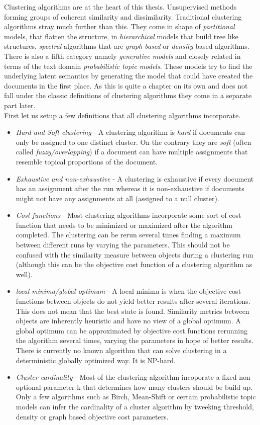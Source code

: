   Clustering algorithms are at the heart of this thesis. Unsupervised methods forming groups of coherent similarity and dissimilarity. Traditional clustering algorithms stray much further than this. They come in shape of \emph{partitional} models, that flatten the structure, in \emph{hierarchical} models that build tree like structures, \emph{spectral} algorithms that are \emph{graph based} or \emph{density} based algorithms. There is also a fifth category namely \emph{generative models} and closely related in terms of the text domain \emph{probabilistic topic models}. These models try to find the underlying latent semantics by generating the model that could have created the documents in the first place. As this is quite a chapter on its own and does not fall under the classic definitions of clustering algorithms they come in a separate part later.\\
  First let us setup a few definitions that all clustering algorithms incorporate.

  \begin{itemize}
    \item \emph{Hard and Soft clustering} - A clustering algorithm is \emph{hard} if documents can only be assigned to one distinct cluster. On the contrary they are \emph{soft} (often called \emph{fuzzy/overlapping}) if a document can have multiple assignments that resemble topical proportions of the document.
    \item \emph{Exhaustive and non-exhaustive} - A clustering is exhaustive if every document has an assignment after the run whereas it is non-exhaustive if documents might not have any assignments at all (assigned to a null cluster).
    \item \emph{Cost functions} - Most clustering algorithms incorporate some sort of cost function that needs to be minimized or maximized after the algorithm completed. The clustering can be rerun several times finding a maximum between different runs by varying the parameters. This should not be confused with the similarity measure between objects during a clustering run (although this can be the objective cost function of a clustering algorithm as well).
    \item \emph{local minima/global optimum} - A local minima is when the objective cost functions between objects do not yield better results after several iterations. This does not mean that the best state is found. Similarity metrics between objects are inherently heuristic and have no view of a global optimum. A global optimum can be approximated by objective cost functions rerunning the algorithm several times, varying the parameters in hope of better results. There is currently no known algorithm that can solve clustering in a deterministic globally optimized way. It is NP-hard.
    \item \emph{Cluster cardinality} - Most of the clustering algorithm incoporate a fixed non optional parameter k that determines how many clusters should be build up. Only a few algorithms such as Birch, Mean-Shift or certain probabilistic topic models can infer the cardinality of a cluster algorithm by tweeking threshold, density or graph based objective cost parameters.
  \end{itemize}

